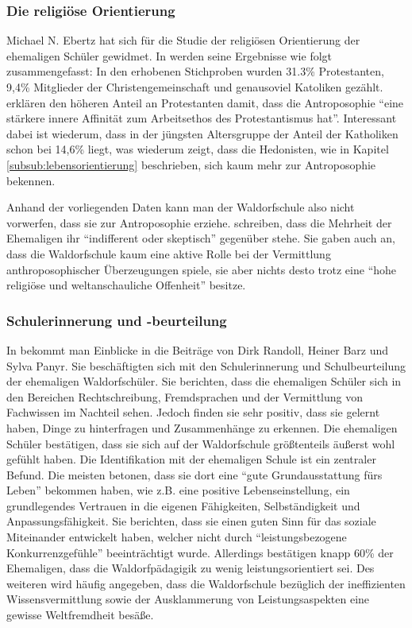 \subsubsection{Die religiöse Orientierung}

Michael N. Ebertz hat sich für die Studie der religiösen Orientierung der ehemaligen Schüler gewidmet. In \citet[][S. 18f]{randoll07} werden seine Ergebnisse wie folgt zusammengefasst: In den erhobenen Stichproben wurden 31.3\% Protestanten, 9,4\% Mitglieder der Christengemeinschaft und genausoviel Katoliken gezählt. \citet[][S. 18]{randoll07} erklären den höheren Anteil an Protestanten damit, dass die Antroposophie \enquote{eine stärkere innere Affinität zum Arbeitsethos des Protestantismus hat}. Interessant dabei ist wiederum, dass in der jüngsten Altersgruppe der Anteil der Katholiken schon bei 14,6\% liegt, was wiederum zeigt, dass die Hedonisten, wie in Kapitel \ref{subsub:lebensorientierung} beschrieben, sich kaum mehr zur Antroposophie bekennen. 

Anhand der vorliegenden Daten kann man der Waldorfschule also nicht vorwerfen, dass sie zur Antroposophie erziehe. \citet[][S. 19]{randoll07} schreiben, dass die Mehrheit der Ehemaligen ihr \enquote{indifferent oder skeptisch} gegenüber stehe. Sie gaben auch an, dass die Waldorfschule kaum eine aktive Rolle bei der Vermittlung anthroposophischer Überzeugungen spiele, sie aber nichts desto trotz eine \enquote{hohe religiöse und weltanschauliche Offenheit} besitze.

\subsubsection{Schulerinnerung und -beurteilung}
\label{subsub:Erinnerung}

In \citet[][S. 19f]{randoll07} bekommt man Einblicke in die Beiträge von Dirk Randoll, Heiner Barz und Sylva Panyr. Sie beschäftigten sich mit den Schulerinnerung und Schulbeurteilung der ehemaligen Waldorfschüler. Sie berichten, dass die ehemaligen Schüler sich in den Bereichen Rechtschreibung, Fremdsprachen und der Vermittlung von Fachwissen im Nachteil sehen. Jedoch finden sie sehr positiv, dass sie gelernt haben, Dinge zu hinterfragen und Zusammenhänge zu erkennen. Die ehemaligen Schüler bestätigen, dass sie sich auf der Waldorfschule größtenteils äußerst wohl gefühlt haben. Die Identifikation mit der ehemaligen Schule ist ein zentraler Befund. Die meisten betonen, dass sie dort eine \enquote{gute Grundausstattung fürs Leben} bekommen haben, wie z.B. eine positive Lebenseinstellung, ein grundlegendes Vertrauen in die eigenen Fähigkeiten, Selbständigkeit und Anpassungsfähigkeit. Sie berichten, dass sie einen guten Sinn für das soziale Miteinander entwickelt haben, welcher nicht durch \enquote{leistungsbezogene Konkurrenzgefühle} beeinträchtigt wurde. Allerdings bestätigen knapp 60\% der Ehemaligen, dass die Waldorfpädagigik zu wenig leistungsorientiert sei. Des weiteren wird häufig angegeben, dass die Waldorfschule bezüglich der ineffizienten Wissensvermittlung sowie der Ausklammerung von Leistungsaspekten eine gewisse Weltfremdheit besäße. 

